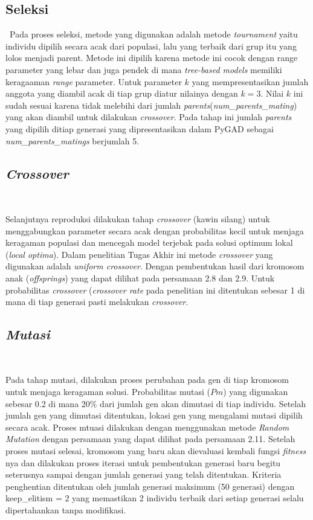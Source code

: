     \subsection{Seleksi}\label{sec:method construction}\
    Pada proses seleksi, metode yang digunakan adalah metode \textit{tournament} yaitu individu dipilih secara acak dari populasi, lalu yang terbaik dari grup itu yang lolos menjadi parent. Metode ini dipilih karena metode ini cocok dengan range parameter yang lebar dan juga pendek di mana \textit{tree-based models} memiliki keragaaman \textit{range} parameter. Untuk parameter $k$ yang mempresentasikan jumlah anggota yang diambil acak di tiap grup diatur nilainya dengan $k = 3$. Nilai $k$ ini sudah sesuai karena tidak melebihi dari jumlah \textit{parents}(\textit{num\_parents\_mating}) yang akan diambil untuk dilakukan \textit{crossover}. Pada tahap ini jumlah \textit{parents} yang dipilih ditiap generasi yang dipresentasikan dalam PyGAD sebagai \textit{num\_parents\_matings} berjumlah 5.
    
    \subsection{\textit{Crossover}}\label{sec:method construction}\
    
    Selanjutnya reproduksi dilakukan tahap \textit{crossover} (kawin silang) untuk menggabungkan parameter secara acak dengan probabilitas kecil untuk menjaga keragaman populasi dan mencegah model terjebak pada solusi optimum lokal (\textit{local optima}). Dalam penelitian Tugas Akhir ini metode \textit{crossover} yang digunakan adalah \textit{uniform crossover}. Dengan pembentukan hasil dari kromosom anak (\textit{offsprings}) yang dapat dilihat pada persamaan 2.8 dan 2.9. Untuk probabilitas \textit{crossover} (\textit{crossover rate} pada penelitian ini ditentukan sebesar 1 di mana di tiap generasi pasti melakukan \textit{crossover}. 

    \subsection{\textit{Mutasi}}\label{sec:method construction}\

    Pada tahap mutasi, dilakukan proses perubahan pada gen di tiap kromosom untuk menjaga keragaman solusi. Probabilitas mutasi ($Pm$) yang digunakan sebesar 0.2 di mana 20\% dari jumlah gen akan dimutasi di tiap individu. Setelah jumlah gen yang dimutasi ditentukan, lokasi gen yang mengalami mutasi dipilih secara acak. Proses mtuasi dilakukan dengan menggunakan metode \textit{Random Mutation} dengan persamaan yang dapat dilihat pada persamaan 2.11. Setelah proses mutasi selesai, kromosom yang baru akan dievaluasi kembali fungsi \textit{fitness} nya dan dilakukan proses iterasi untuk pembentukan generasi baru begitu seterusnya sampai dengan jumlah generasi yang telah ditentukan. Kriteria penghentian ditentukan oleh jumlah generasi maksimum (50 generasi) dengan keep\_elitism = 2 yang memastikan 2 individu terbaik dari setiap generasi selalu dipertahankan tanpa modifikasi.
    
